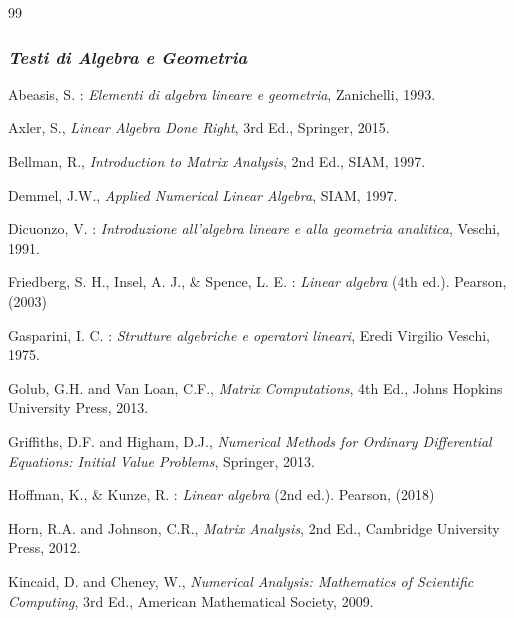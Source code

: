 \newpage




\begin{thebibliography}{99}
\makeatletter
\renewcommand{\@biblabel}[1]{}
\makeatother
\bibitem{}


\makeatletter
\renewcommand{\@biblabel}[1]{[#1]}
\setcounter{enumiv}{0} \makeatother


\subsubsection{ \emph{Testi di
Algebra e Geometria}}



Abeasis, S. : {\em Elementi di algebra lineare e geometria}, Zanichelli,  1993.

Axler, S., {\em Linear Algebra Done Right}, 3rd Ed., Springer, 2015.

Bellman, R., {\em Introduction to Matrix Analysis}, 2nd Ed., SIAM, 1997.

Demmel, J.W., {\em Applied Numerical Linear Algebra}, SIAM, 1997.

Dicuonzo, V. : {\em Introduzione all'algebra lineare e alla geometria analitica}, Veschi,  1991.

Friedberg, S. H., Insel, A. J., \& Spence, L. E. :
\textit{Linear algebra} (4th ed.).
Pearson, (2003)

Gasparini, I. C. : {\em Strutture algebriche e operatori lineari}, Eredi Virgilio Veschi,  1975.

Golub, G.H. and Van Loan, C.F., {\em Matrix Computations}, 4th Ed., Johns Hopkins University Press, 2013.

Griffiths, D.F. and Higham, D.J., {\em Numerical Methods for Ordinary Differential Equations: Initial Value Problems}, Springer, 2013.

Hoffman, K., \& Kunze, R. : 
\textit{Linear algebra} (2nd ed.).
Pearson, (2018)

Horn, R.A. and Johnson, C.R., {\em Matrix Analysis}, 2nd Ed., Cambridge University Press, 2012.

Kincaid, D. and Cheney, W., {\em Numerical Analysis: Mathematics of Scientific Computing}, 3rd Ed., American Mathematical Society, 2009.


\end{thebibliography}
